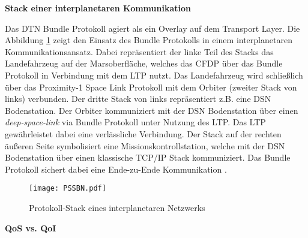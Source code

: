 \textbf{Stack einer interplanetaren Kommunikation}

Das \gls{DTN} Bundle Protokoll agiert als ein Overlay auf dem Transport Layer. Die
Abbildung \ref{fig:PSSBN} zeigt den Einsatz des Bundle Protokolls in einem
interplanetaren Kommunikationsansatz.
Dabei repr{\"a}sentiert der linke Teil des Stacks das Landefahrzeug auf der
Marsoberfl{\"a}che, welches das \gls{CFDP} {\"u}ber das Bundle Protokoll in
Verbindung mit dem \gls{LTP} nutzt.
Das Landefahrzeug wird schlie{\ss}lich {\"u}ber das Proximity-1 Space Link
Protokoll mit dem Orbiter (zweiter Stack von links) verbunden. Der dritte Stack
von links repr{\"a}sentiert z.B. eine \gls{DSN} Bodenstation. Der
Orbiter kommuniziert mit der \gls{DSN} Bodenstation {\"u}ber einen
\textit{deep-space-link} via Bundle Protokoll unter Nutzung des \gls{LTP}. Das
\gls{LTP} gew{\"a}hrleistet dabei eine verl{\"a}ssliche Verbindung. Der Stack
auf der rechten {\"a}u{\ss}eren Seite symbolisiert eine Missionskontrollstation,
welche mit der \gls{DSN} Bodenstation {\"u}ber einen klassische
\gls{TCP}/\gls{IP} Stack kommuniziert. Das Bundle Protokoll sichert dabei eine
Ende-zu-Ende Kommunikation \cite{DTNBundle}.

\begin{figure}[H]
\centering
\texttt{[image: PSSBN.pdf]}
\caption[Protokoll-Stack eines interplanetaren Netzwerks]
{Protokoll-Stack eines interplanetaren Netzwerks \cite{DTNBundle}}
\label{fig:PSSBN}
\end{figure}

\textbf{\gls{QoS} vs. \gls{QoI}}

